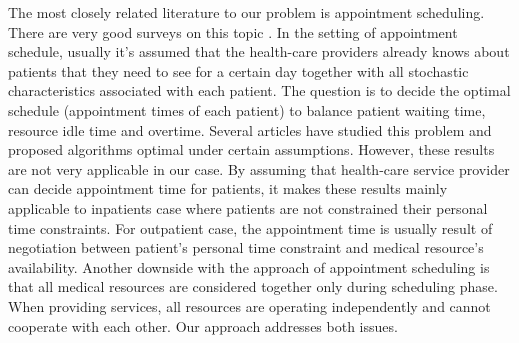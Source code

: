 The most closely related literature to our problem is appointment scheduling. There are very good surveys on this topic \cite{gupta2008appointment, cayirli2003outpatient}. In the setting of appointment schedule, usually it's assumed that the health-care providers already knows about patients that they need to see for a certain day together with all stochastic characteristics associated with each patient. The question is to decide the optimal schedule (appointment times of each patient) to balance patient waiting time, resource idle time and overtime. Several articles \cite{kaandorp2007optimal,denton2003sequential,begen2011appointment} have studied this problem and proposed algorithms optimal under certain assumptions. However, these results are not very applicable in our case. By assuming that health-care service provider can decide appointment time for patients, it makes these results mainly applicable to inpatients case where patients are not constrained their personal time constraints. For outpatient case, the appointment time is usually result of negotiation between patient's personal time constraint and medical resource's availability. Another downside with the approach of appointment scheduling is that all medical resources are considered together only during scheduling phase. When providing services, all resources are operating independently and cannot cooperate with each other. Our approach addresses both issues.